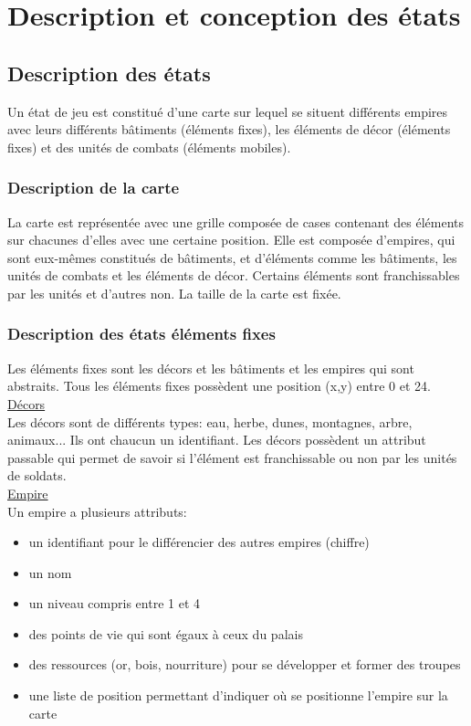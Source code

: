 \documentclass[12pt,a4paper]{article}
\begin{document}
\newpage

\section{Description et conception des états}

\subsection{Description des états}

Un état de jeu est constitué d'une carte sur lequel se situent différents empires avec leurs différents bâtiments (éléments fixes), les éléments de décor (éléments fixes) et des unités de combats (éléments mobiles).

\subsubsection{Description de la carte}

La carte est représentée avec une grille composée de cases contenant des éléments sur chacunes d'elles avec une certaine position. Elle est composée d'empires, qui sont eux-mêmes constitués de bâtiments, et d'éléments comme les bâtiments, les unités de combats et les éléments de décor. Certains éléments sont franchissables par les unités et d'autres non. La taille de la carte est fixée.

\subsubsection{Description des états éléments fixes}

Les éléments fixes sont les décors et les bâtiments et les empires qui sont abstraits. Tous les éléments fixes possèdent une position (x,y) entre 0 et 24.\\

\uline{Décors}\\

Les décors sont de différents types: eau, herbe, dunes, montagnes, arbre, animaux... Ils ont chaucun un identifiant. Les décors possèdent un attribut passable qui permet de savoir si l'élément est franchissable ou non par les unités de soldats.\\

\uline{Empire}\\

Un empire a plusieurs attributs:
\begin{itemize}
\item un identifiant pour le différencier des autres empires (chiffre)
\item un nom
\item un niveau compris entre 1 et 4
\item des points de vie qui sont égaux à ceux du palais
\item des ressources (or, bois, nourriture) pour se développer et former des troupes
\item une liste de position permettant d'indiquer où se positionne l'empire sur la carte
\end{itemize}
\end{document}
